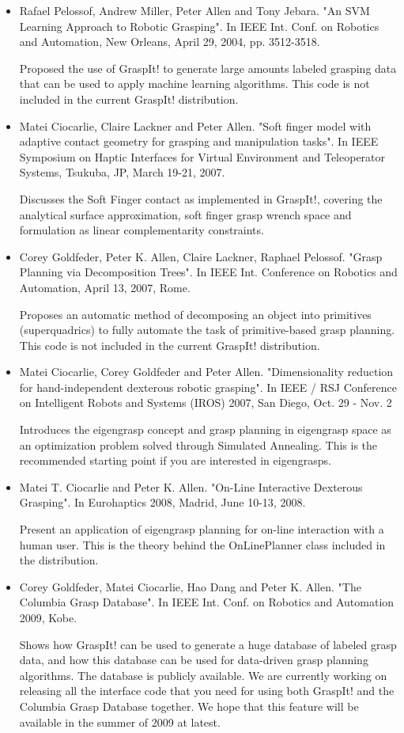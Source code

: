 \begin{itemize}
\item Rafael Pelossof, Andrew Miller, Peter Allen and Tony Jebara. "An SVM
Learning Approach to Robotic Grasping". In IEEE Int. Conf. on Robotics
and Automation, New Orleans, April 29, 2004, pp. 3512-3518.

Proposed the use of GraspIt! to generate large amounts labeled
grasping data that can be used to apply machine learning
algorithms. This code is not included in the current GraspIt!
distribution.

\item Matei Ciocarlie, Claire Lackner and Peter Allen. "Soft finger model
with adaptive contact geometry for grasping and manipulation
tasks". In IEEE Symposium on Haptic Interfaces for Virtual Environment
and Teleoperator Systems, Tsukuba, JP, March 19-21, 2007.

Discusses the Soft Finger contact as implemented in GraspIt!, covering
the analytical surface approximation, soft finger grasp wrench space
and formulation as linear complementarity constraints.

\item Corey Goldfeder, Peter K. Allen, Claire Lackner, Raphael
Pelossof. "Grasp Planning via Decomposition Trees". In IEEE
Int. Conference on Robotics and Automation, April 13, 2007, Rome.

Proposes an automatic method of decomposing an object into primitives
(superquadrics) to fully automate the task of primitive-based grasp
planning. This code is not included in the current GraspIt!
distribution.

\item Matei Ciocarlie, Corey Goldfeder and Peter Allen. "Dimensionality
reduction for hand-independent dexterous robotic grasping". In IEEE /
RSJ Conference on Intelligent Robots and Systems (IROS) 2007, San
Diego, Oct. 29 - Nov. 2

Introduces the eigengrasp concept and grasp planning in eigengrasp
space as an optimization problem solved through Simulated
Annealing. This is the recommended starting point if you are
interested in eigengrasps.

\item Matei T. Ciocarlie and Peter K. Allen. "On-Line Interactive
Dexterous Grasping". In Eurohaptics 2008, Madrid, June 10-13, 2008.

Present an application of eigengrasp planning for on-line interaction
with a human user. This is the theory behind the OnLinePlanner class
included in the distribution.

\item Corey Goldfeder, Matei Ciocarlie, Hao Dang and Peter K. Allen. "The
Columbia Grasp Database". In IEEE Int. Conf. on Robotics and
Automation 2009, Kobe.

Shows how GraspIt! can be used to generate a huge database of labeled
grasp data, and how this database can be used for data-driven grasp
planning algorithms. The database is publicly available. We are
currently working on releasing all the interface code that you need
for using both GraspIt! and the Columbia Grasp Database together. We
hope that this feature will be available in the summer of 2009 at
latest.

\end{itemize}
